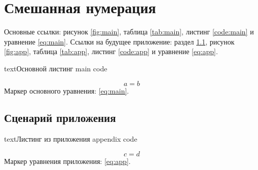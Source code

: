 \documentclass[a4paper,12pt]{report}
\begin{document}
\chapter{Смешанная нумерация}
Основные ссылки: рисунок \ref{fig:main}, таблица \ref{tab:main}, листинг \ref{code:main} и уравнение \eqref{eq:main}.
Ссылки на будущее приложение: раздел \ref{app:one}, рисунок \ref{fig:app}, таблица \ref{tab:app}, листинг \ref{code:app} и уравнение \eqref{eq:app}.
\begin{code}{text}{Основной листинг}
main code
\end{code}
\begin{equation}
  \label{eq:main}
  a = b
\end{equation}
Маркер основного уравнения: \eqref{eq:main}.
\appendixChapter
\section{Сценарий приложения}\label{app:one}
\begin{code}{text}{Листинг из приложения}
appendix code
\end{code}
\begin{equation}
  \label{eq:app}
  c = d
\end{equation}
Маркер уравнения приложения: \eqref{eq:app}.
\end{document}
